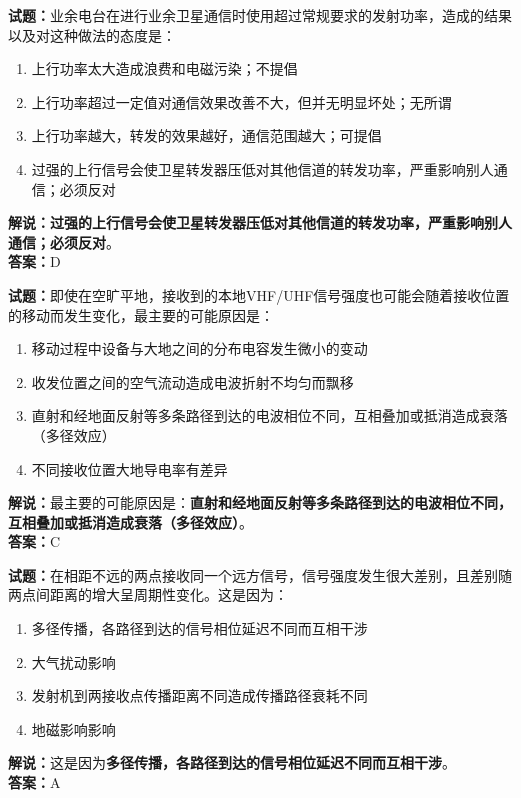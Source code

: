 \documentclass{ctexbook}
\begin{document}
\bigskip


\noindent\textbf{试题：}业余电台在进行业余卫星通信时使用超过常规要求的发射功率，造成的结果以及对这种做法的态度是：
\begin{enumerate}[leftmargin=3em]
\item 上行功率太大造成浪费和电磁污染；不提倡
\item 上行功率超过一定值对通信效果改善不大，但并无明显坏处；无所谓
\item 上行功率越大，转发的效果越好，通信范围越大；可提倡
\item 过强的上行信号会使卫星转发器压低对其他信道的转发功率，严重影响别人通信；必须反对
\end{enumerate}
\noindent\textbf{解说：}\textbf{过强的上行信号会使卫星转发器压低对其他信道的转发功率，严重影响别人通信；必须反对}。\\\noindent\textbf{答案：}D



\bigskip


\noindent\textbf{试题：}即使在空旷平地，接收到的本地VHF/UHF信号强度也可能会随着接收位置的移动而发生变化，最主要的可能原因是：
\begin{enumerate}[leftmargin=3em]
\item 移动过程中设备与大地之间的分布电容发生微小的变动
\item 收发位置之间的空气流动造成电波折射不均匀而飘移
\item 直射和经地面反射等多条路径到达的电波相位不同，互相叠加或抵消造成衰落（多径效应）
\item 不同接收位置大地导电率有差异
\end{enumerate}
\noindent\textbf{解说：}最主要的可能原因是：\textbf{直射和经地面反射等多条路径到达的电波相位不同，互相叠加或抵消造成衰落（多径效应）}。\\\noindent\textbf{答案：}C




\bigskip


\noindent\textbf{试题：}在相距不远的两点接收同一个远方信号，信号强度发生很大差别，且差别随两点间距离的增大呈周期性变化。这是因为：
\begin{enumerate}[leftmargin=3em]
\item 多径传播，各路径到达的信号相位延迟不同而互相干涉
\item 大气扰动影响
\item 发射机到两接收点传播距离不同造成传播路径衰耗不同
\item 地磁影响影响
\end{enumerate}
\noindent\textbf{解说：}这是因为\textbf{多径传播，各路径到达的信号相位延迟不同而互相干涉}。\\\noindent\textbf{答案：}A
\end{document}
